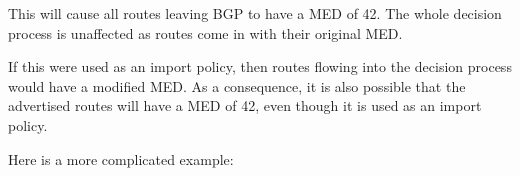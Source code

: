 \noindent{}

This will cause all routes leaving BGP to have a MED of 42.  The whole decision
process is unaffected as routes come in with their original MED.  

If this were used as an import policy, then routes flowing into the decision
process would have a modified MED.  As a consequence, it is also possible that
the advertised routes will have a MED of 42, even though it is used as an import
policy.

\newpage
Here is a more complicated example:

